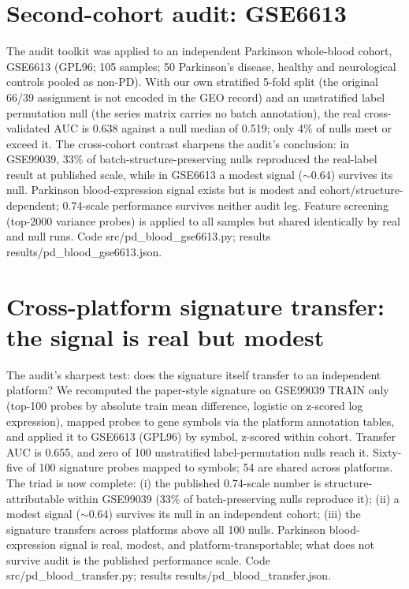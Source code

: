 \section{Second-cohort audit: GSE6613}
The audit toolkit was applied to an independent Parkinson whole-blood cohort,
GSE6613 (GPL96; 105 samples; 50 Parkinson's disease, healthy and neurological
controls pooled as non-PD). With our own stratified 5-fold split (the original
66/39 assignment is not encoded in the GEO record) and an unstratified label
permutation null (the series matrix carries no batch annotation), the real
cross-validated AUC is 0.638 against a null median of 0.519; only 4\% of nulls
meet or exceed it. The cross-cohort contrast sharpens the audit's conclusion:
in GSE99039, 33\% of batch-structure-preserving nulls reproduced the
real-label result at published scale, while in GSE6613 a modest signal
($\sim$0.64) survives its null. Parkinson blood-expression signal exists but is
modest and cohort/structure-dependent; 0.74-scale performance survives neither
audit leg. Feature screening (top-2000 variance probes) is applied to all
samples but shared identically by real and null runs. Code
src/pd\_blood\_gse6613.py; results results/pd\_blood\_gse6613.json.
\section{Cross-platform signature transfer: the signal is real but modest}
The audit's sharpest test: does the signature itself transfer to an independent
platform? We recomputed the paper-style signature on GSE99039 TRAIN only
(top-100 probes by absolute train mean difference, logistic on z-scored log
expression), mapped probes to gene symbols via the platform annotation tables,
and applied it to GSE6613 (GPL96) by symbol, z-scored within cohort. Transfer
AUC is 0.655, and zero of 100 unstratified label-permutation nulls reach it.
Sixty-five of 100 signature probes mapped to symbols; 54 are shared across
platforms. The triad is now complete: (i) the published 0.74-scale number is
structure-attributable within GSE99039 (33\% of batch-preserving nulls
reproduce it); (ii) a modest signal ($\sim$0.64) survives its null in an
independent cohort; (iii) the signature transfers across platforms above all
100 nulls. Parkinson blood-expression signal is real, modest, and
platform-transportable; what does not survive audit is the published
performance scale. Code src/pd\_blood\_transfer.py; results
results/pd\_blood\_transfer.json.
